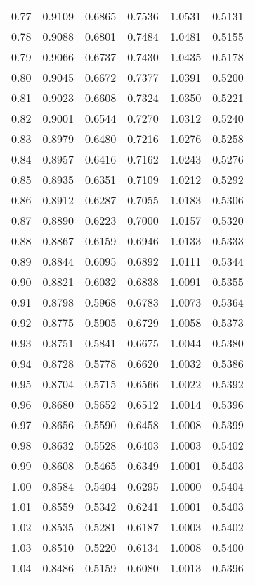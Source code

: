 \documentclass{article}
\begin{document}
\begin{longtable}{cccccc}
0.77 & 0.9109 & 0.6865 & 0.7536 & 1.0531 & 0.5131 \\
0.78 & 0.9088 & 0.6801 & 0.7484 & 1.0481 & 0.5155 \\
0.79 & 0.9066 & 0.6737 & 0.7430 & 1.0435 & 0.5178 \\
0.80 & 0.9045 & 0.6672 & 0.7377 & 1.0391 & 0.5200 \\
0.81 & 0.9023 & 0.6608 & 0.7324 & 1.0350 & 0.5221 \\
0.82 & 0.9001 & 0.6544 & 0.7270 & 1.0312 & 0.5240 \\
0.83 & 0.8979 & 0.6480 & 0.7216 & 1.0276 & 0.5258 \\
0.84 & 0.8957 & 0.6416 & 0.7162 & 1.0243 & 0.5276 \\
0.85 & 0.8935 & 0.6351 & 0.7109 & 1.0212 & 0.5292 \\
0.86 & 0.8912 & 0.6287 & 0.7055 & 1.0183 & 0.5306 \\
0.87 & 0.8890 & 0.6223 & 0.7000 & 1.0157 & 0.5320 \\
0.88 & 0.8867 & 0.6159 & 0.6946 & 1.0133 & 0.5333 \\
0.89 & 0.8844 & 0.6095 & 0.6892 & 1.0111 & 0.5344 \\
0.90 & 0.8821 & 0.6032 & 0.6838 & 1.0091 & 0.5355 \\
0.91 & 0.8798 & 0.5968 & 0.6783 & 1.0073 & 0.5364 \\
0.92 & 0.8775 & 0.5905 & 0.6729 & 1.0058 & 0.5373 \\
0.93 & 0.8751 & 0.5841 & 0.6675 & 1.0044 & 0.5380 \\
0.94 & 0.8728 & 0.5778 & 0.6620 & 1.0032 & 0.5386 \\
0.95 & 0.8704 & 0.5715 & 0.6566 & 1.0022 & 0.5392 \\
0.96 & 0.8680 & 0.5652 & 0.6512 & 1.0014 & 0.5396 \\
0.97 & 0.8656 & 0.5590 & 0.6458 & 1.0008 & 0.5399 \\
0.98 & 0.8632 & 0.5528 & 0.6403 & 1.0003 & 0.5402 \\
0.99 & 0.8608 & 0.5465 & 0.6349 & 1.0001 & 0.5403 \\
1.00 & 0.8584 & 0.5404 & 0.6295 & 1.0000 & 0.5404 \\
1.01 & 0.8559 & 0.5342 & 0.6241 & 1.0001 & 0.5403 \\
1.02 & 0.8535 & 0.5281 & 0.6187 & 1.0003 & 0.5402 \\
1.03 & 0.8510 & 0.5220 & 0.6134 & 1.0008 & 0.5400 \\
1.04 & 0.8486 & 0.5159 & 0.6080 & 1.0013 & 0.5396 \\

\end{longtable}
\end{document}
